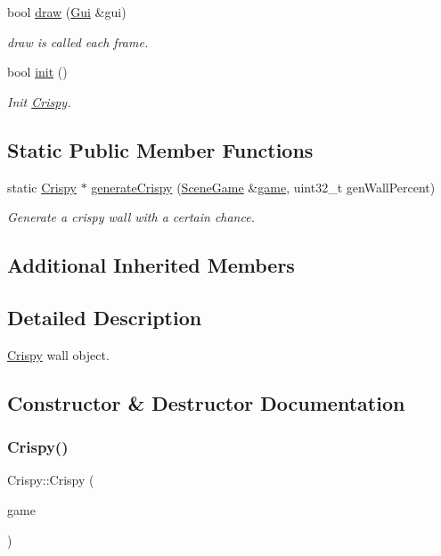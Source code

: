 \begin{DoxyCompactItemize}
bool \hyperlink{class_crispy_a266bebd70e55a7d08ba1688af0f4adf0}{draw} (\hyperlink{class_gui}{Gui} \&gui)
\begin{DoxyCompactList}\small\item\em draw is called each frame. \end{DoxyCompactList}\item 
bool \hyperlink{class_crispy_aef91bfa94d0506d25b4cf78098e57912}{init} ()
\begin{DoxyCompactList}\small\item\em Init \hyperlink{class_crispy}{Crispy}. \end{DoxyCompactList}\end{DoxyCompactItemize}
\subsection*{Static Public Member Functions}
\begin{DoxyCompactItemize}
\item 
static \hyperlink{class_crispy}{Crispy} $\ast$ \hyperlink{class_crispy_a30d88975d3874ed4a9d2216abefbf2c0}{generate\+Crispy} (\hyperlink{class_scene_game}{Scene\+Game} \&\hyperlink{class_a_entity_aa2c05db944a8b7487eb8470dd20211ab}{game}, uint32\+\_\+t gen\+Wall\+Percent)
\begin{DoxyCompactList}\small\item\em Generate a crispy wall with a certain chance. \end{DoxyCompactList}\end{DoxyCompactItemize}
\subsection*{Additional Inherited Members}


\subsection{Detailed Description}
\hyperlink{class_crispy}{Crispy} wall object. 

\subsection{Constructor \& Destructor Documentation}
\mbox{\label{class_crispy_a78109acb28dc9efc1d74cf952a9709d9}} 
\subsubsection{\texorpdfstring{Crispy()}{Crispy()}\hspace{0.1cm}{\footnotesize\ttfamily [1/2]}}
{\footnotesize\ttfamily Crispy\+::\+Crispy (\begin{DoxyParamCaption}\item[{\hyperlink{class_scene_game}{Scene\+Game} \&}]{game }\end{DoxyParamCaption})\hspace{0.3cm}{\ttfamily [explicit]}}



